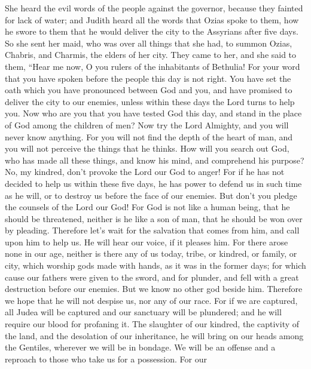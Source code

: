  She heard the evil words of the people against the
governor, because they fainted for lack of water; and Judith heard all
the words that Ozias spoke to them, how he swore to them that he would
deliver the city to the Assyrians after five days.  So she
sent her maid, who was over all things that she had, to summon Ozias,
Chabris, and Charmis, the elders of her city.  They came to
her, and she said to them, ``Hear me now, O you rulers of the
inhabitants of Bethulia! For your word that you have spoken before the
people this day is not right. You have set the oath which you have
pronounced between God and you, and have promised to deliver the city to
our enemies, unless within these days the Lord turns to help you.
 Now who are you that you have tested God this day, and
stand in the place of God among the children of men?  Now
try the Lord Almighty, and you will never know anything. 
For you will not find the depth of the heart of man, and you will not
perceive the things that he thinks. How will you search out God, who has
made all these things, and know his mind, and comprehend his purpose?
No, my kindred, don't provoke the Lord our God to anger! 
For if he has not decided to help us within these five days, he has
power to defend us in such time as he will, or to destroy us before the
face of our enemies.  But don't you pledge the counsels of
the Lord our God! For God is not like a human being, that he should be
threatened, neither is he like a son of man, that he should be won over
by pleading.  Therefore let's wait for the salvation that
comes from him, and call upon him to help us. He will hear our voice, if
it pleases him.  For there arose none in our age, neither
is there any of us today, tribe, or kindred, or family, or city, which
worship gods made with hands, as it was in the former days;
 for which cause our fathers were given to the sword, and
for plunder, and fell with a great destruction before our enemies.
 But we know no other god beside him. Therefore we hope
that he will not despise us, nor any of our race.  For if
we are captured, all Judea will be captured and our sanctuary will be
plundered; and he will require our blood for profaning it. 
The slaughter of our kindred, the captivity of the land, and the
desolation of our inheritance, he will bring on our heads among the
Gentiles, wherever we will be in bondage. We will be an offense and a
reproach to those who take us for a possession.  For our
